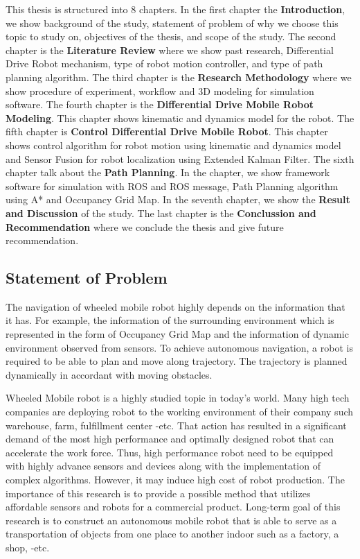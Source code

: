 \hspace{1.27cm}
This thesis is structured into 8 chapters. In the first chapter the \textbf{Introduction}, we show background of the study, statement of problem of why we choose this topic to study on, objectives of the thesis, and scope of the study. The second chapter is the \textbf{Literature Review} where we show past research, Differential Drive Robot mechanism, type of robot motion controller, and type of path planning algorithm. The third chapter is the \textbf{Research Methodology} where we show procedure of experiment, workflow and 3D modeling for simulation software. The fourth chapter is the \textbf{Differential Drive Mobile Robot Modeling}. This chapter shows kinematic and dynamics model for the robot. The fifth chapter is \textbf{Control Differential Drive Mobile Robot}. This chapter shows control algorithm for robot motion using kinematic and dynamics model and Sensor Fusion for robot localization using Extended Kalman Filter. The sixth chapter talk about the \textbf{Path Planning}. In the chapter, we show  framework software for simulation with ROS and ROS message, Path Planning algorithm using A* and Occupancy Grid Map. In the seventh chapter, we show the \textbf{Result and Discussion} of the study. The last chapter is the \textbf{Conclussion and Recommendation} where we conclude the thesis and give future recommendation.\par




\subsection{Statement of Problem}
\hspace{1.27cm}
The navigation of wheeled mobile robot highly depends on the information that it has. For example, the information of the surrounding environment which is represented in the form of Occupancy Grid Map and the information of dynamic environment observed from sensors. To achieve autonomous navigation, a robot is required to be able to plan and move along trajectory. The trajectory is planned dynamically in accordant with moving obstacles.\par

\hspace{1.27cm}
Wheeled Mobile robot is a highly studied topic in today's world. Many high tech companies are deploying robot to the working environment of their company such warehouse, farm, fulfillment center -etc. That action has resulted in a significant demand of the most high performance and optimally designed robot that can accelerate the work force. Thus, high performance robot need to be equipped with highly advance sensors and devices along with the implementation of complex algorithms. However, it may induce high cost of robot production. The importance of this research is to provide a possible method that utilizes affordable sensors and robots for a commercial product. Long-term goal of this research is to construct an autonomous mobile robot that is able to serve as a transportation of objects from one place to another indoor such as a factory, a shop, -etc.\par



